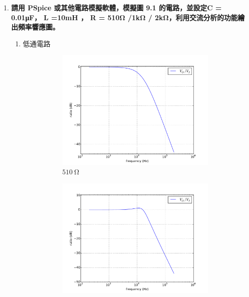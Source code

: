 \documentclass[12pt, a4paper]{article}
\def\large{\fontsize{14}{21}\selectfont}
\begin{document}
\begin{enumerate}[itemsep=20pt, topsep=10pt]
\begin{enumerate}[label=(\alph*)]
    \end{enumerate}
  \item {\large\bf 請用 PSpice 或其他電路模擬軟體，模擬圖 9.1 的電路，並設定C = 0.01μF， L =10mH ， R = 510Ω /1kΩ / 2kΩ，利用交流分析的功能繪出頻率響應圖。} 
    \begin{enumerate}[label=(\alph*)]
      \item 低通電路  \begin{figure}[H]
        \centering
        \begin{subfigure}[b]{0.45\textwidth}
          \includegraphics[width=1\textwidth]{circuit/p11.pdf}
          \caption{$\SI{510}\ohm$}
        \end{subfigure}
        \begin{subfigure}[b]{0.45\textwidth}
          \includegraphics[width=1\textwidth]{circuit/p12.pdf}

\end{subfigure}
\end{figure}
\end{enumerate}
\end{enumerate}
\end{document}
